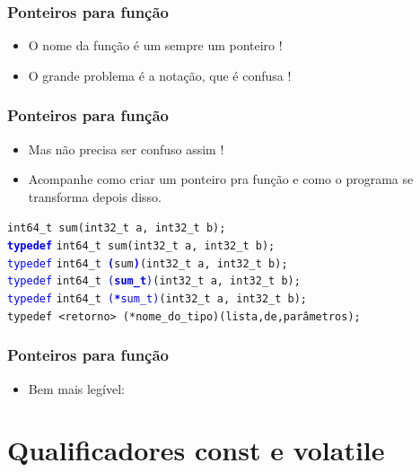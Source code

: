 \documentclass{beamer}
\begin{document}
\begin{frame}
	\frametitle{Ponteiros para função}
	\begin{itemize}
		\item O nome da função é um sempre um ponteiro !
		\item O grande problema é a notação, que é confusa !
	\end{itemize}
	
\end{frame}

\begin{frame}
	\frametitle{Ponteiros para função}
	\begin{itemize}
		\item Mas não precisa ser confuso assim !
		\item Acompanhe como criar um ponteiro pra função e como o programa se transforma depois disso.
	\end{itemize}
	\vspace*{0.5cm}
    {\scriptsize
\texttt{int64\_t sum(int32\_t a, int32\_t b);} \\
\texttt{\textcolor{blue}{\textbf{typedef}}} \texttt{int64\_t sum(int32\_t a, int32\_t b);} \\
\texttt{\textcolor{blue}{typedef}} \texttt{int64\_t \texttt{\textcolor{blue}{\textbf{(}}}sum\texttt{\textcolor{blue}{\textbf{)}}}(int32\_t a, int32\_t b);} \\
\texttt{\textcolor{blue}{typedef}} \texttt{int64\_t \texttt{\textcolor{blue}{(\textbf{sum\_t})}}(int32\_t a, int32\_t b);} \\
\texttt{\textcolor{blue}{typedef}} \texttt{int64\_t \texttt{\textcolor{blue}{(\textbf{*}sum\_t)}}(int32\_t a, int32\_t b);} \\
\vspace*{0.5cm}
\texttt{typedef <retorno> (*nome\_do\_tipo)(lista,de,parâmetros);}
}
\end{frame}

\begin{frame}
	\frametitle{Ponteiros para função}
	\begin{itemize}
		\item Bem mais legível:
	\end{itemize}
	
\end{frame}

\section{Qualificadores const e volatile}
\end{document}
